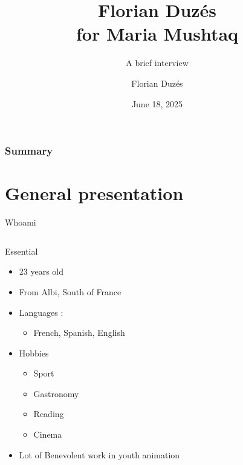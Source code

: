 \documentclass[hyperref={bookmarks=false},aspectratio=169]{beamer}
\title[Florian for Maria Mushtaq]{\Huge{Florian Duzés} \\for \bfseries{Maria Mushtaq}}
\subtitle{A brief interview}
\author[Florian Duzés]{Florian Duzés}
\date[2025]{June 18, 2025}
\begin{document}
\begin{frame}
    \titlepage
\end{frame}


\begin{frame}
\frametitle{Summary}
\tableofcontents
\end{frame}

\section{General presentation}

\begin{frame}{Whoami}

  \begin{columns}
    \begin{column}{0.7\textwidth}
      \begin{block}{Essential}
        \begin{itemize}
          \item<1-> 23 years old
          \item<2-> From Albi, South of France
          \item<3-> Languages :
          \begin{itemize}
            \item<3-> French, Spanish, English
          \end{itemize}
          \item<4-> Hobbies
          \begin{itemize}
            \item<4-> Sport
            \item<4-> Gastronomy
            \item<4-> Reading
            \item<4-> Cinema
          \end{itemize}
          \item<5-> Lot of Benevolent work in youth animation
        \end{itemize}
      \end{block}
    \end{column}


\end{columns}
\end{frame}
\end{document}
